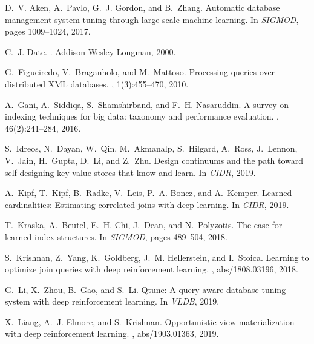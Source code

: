 \documentclass[11pt]{article}
\begin{document}
\begin{thebibliography}{10}

D.~V. Aken, A.~Pavlo, G.~J. Gordon, and B.~Zhang.
\newblock Automatic database management system tuning through large-scale
  machine learning.
\newblock In {\em SIGMOD}, pages 1009--1024, 2017.

C.~J. Date.
.
\newblock Addison-Wesley-Longman, 2000.

G.~Figueiredo, V.~Braganholo, and M.~Mattoso.
\newblock Processing queries over distributed {XML} databases.
, 1(3):455--470, 2010.

A.~Gani, A.~Siddiqa, S.~Shamshirband, and F.~H. Nasaruddin.
\newblock A survey on indexing techniques for big data: taxonomy and
  performance evaluation.
, 46(2):241--284, 2016.

S.~Idreos, N.~Dayan, W.~Qin, M.~Akmanalp, S.~Hilgard, A.~Ross, J.~Lennon,
  V.~Jain, H.~Gupta, D.~Li, and Z.~Zhu.
\newblock Design continuums and the path toward self-designing key-value stores
  that know and learn.
\newblock In {\em CIDR}, 2019.

A.~Kipf, T.~Kipf, B.~Radke, V.~Leis, P.~A. Boncz, and A.~Kemper.
\newblock Learned cardinalities: Estimating correlated joins with deep
  learning.
\newblock In {\em CIDR}, 2019.

T.~Kraska, A.~Beutel, E.~H. Chi, J.~Dean, and N.~Polyzotis.
\newblock The case for learned index structures.
\newblock In {\em SIGMOD}, pages 489--504, 2018.

S.~Krishnan, Z.~Yang, K.~Goldberg, J.~M. Hellerstein, and I.~Stoica.
\newblock Learning to optimize join queries with deep reinforcement learning.
, abs/1808.03196, 2018.

G.~Li, X.~Zhou, B.~Gao, and S.~Li.
\newblock Qtune: A query-aware database tuning system with deep reinforcement
  learning.
\newblock In {\em VLDB}, 2019.

X.~Liang, A.~J. Elmore, and S.~Krishnan.
\newblock Opportunistic view materialization with deep reinforcement learning.
, abs/1903.01363, 2019.


\end{thebibliography}
\end{document}
